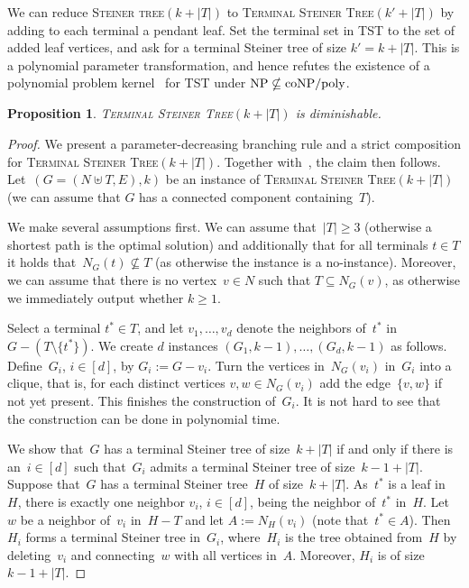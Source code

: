 \documentclass[11pt,a4,USenglish]{article}
\newcommand{\prob}[1]{\textsc{#1}}
\newcommand{\pprob}[2]{\prob{#1}$(#2)$}
\newcommand{\coNP}{\textnormal{coNP}}
\newcommand{\coNPslashpoly}{\textnormal{\coNP{}$/$poly}}
\newcommand{\NP}{\textnormal{NP}}
\newcommand{\NPnotincoNPslashpoly}{$\NP{}\nsubseteq\coNPslashpoly{}$}
\theoremstyle{definition}
\theoremstyle{plain}
\newtheorem{proposition}{Proposition}
\theoremstyle{remark}
\begin{document}
We can reduce \pprob{Steiner tree}{k+|T|} to \pprob{Terminal Steiner Tree}{k'+|T|} by adding to each terminal a pendant leaf.
%
Set the terminal set in TST to the set of added leaf vertices, and ask for a terminal Steiner tree of size $k'=k+|T|$.
This is a polynomial parameter transformation, and hence refutes the existence of a polynomial problem kernel~\cite{DLS14} for TST under \NPnotincoNPslashpoly.


\begin{proposition}%
\label{lem:tstdim}
\pprob{Terminal Steiner Tree}{k+|T|} is diminishable.
\end{proposition}

%
{
  \begin{proof}
  We present a parameter-decreasing branching rule and a strict composition for \pprob{Terminal Steiner Tree}{k+|T|}. 
  Together with~, the claim then follows.
  Let~$(G=(N\uplus T,E), k)$ be an instance of \pprob{Terminal Steiner Tree}{k+|T|} (we can assume that $G$ has a connected component containing~$T$).
  
  We make several assumptions first.
  We can assume that~$|T|\geq 3$ (otherwise a shortest path is the optimal solution) and additionally that for all terminals $t\in T$ it holds that~$N_G(t)\not\subseteq T$ (as otherwise the instance is a no-instance).
  Moreover, we can assume that there is no vertex~$v\in N$ such that $T\subseteq N_G(v)$, as otherwise we immediately output whether $k\geq 1$.
  
  Select a terminal $t^*\in T$, and let $v_1,\ldots,v_d$ denote the neighbors of~$t^*$ in~$G-(T\setminus\{t^*\})$.
  We create $d$ instances $(G_1,k-1),\ldots,(G_d,k-1)$ as follows.
  Define~$G_i$, $i\in[d]$, by $G_i:=G-v_i$. 
%
  Turn the vertices in~$N_G(v_i)$ in~$G_i$ into a clique, that is, for each distinct vertices $v,w\in N_G(v_i)$ add the edge~$\{v,w\}$ if not yet present. 
%
  This finishes the construction of~$G_i$.
  It is not hard to see that the construction can be done in polynomial time.

  We show that~$G$ has a terminal Steiner tree of size~$k+|T|$ if and only if there is an~$i\in[d]$ such that~$G_i$ admits a terminal Steiner tree of size~$k-1+|T|$. 
  Suppose that~$G$ has a terminal Steiner tree~$H$ of size~$k+|T|$.
  As~$t^*$ is a leaf in~$H$, there is exactly one neighbor $v_i$, $i\in[d]$, being the neighbor of~$t^*$ in~$H$.
  Let~$w$ be a neighbor of~$v_i$ in~$H-T$ and let $A:=N_H(v_i)$ (note that~$t^*\in A$).
  Then~$H_i$ forms a terminal Steiner tree in~$G_i$, where~$H_i$ is the tree obtained from~$H$ by deleting~$v_i$ and connecting~$w$ with all vertices in~$A$.
  Moreover, $H_i$ is of size~$k-1+|T|$.


\end{proof}}
\end{document}
